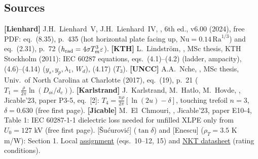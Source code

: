 \subsection*{Sources}
\small \textbf{[Lienhard]} J.H.~Lienhard~V, J.H.~Lienhard~IV, , 6th ed., v6.00 (2024), free PDF: eq.~(8.35), p.~435 (hot horizontal plate facing up, \(\mathrm{Nu}=0.14\,\mathrm{Ra}^{1/3}\)) and eq.~(2.31), p.~72 (\(h_{\rm rad}=4\sigma T_m^3\varepsilon\)).
\textbf{[KTH]} L.~Lindstr\"om, , MSc thesis, KTH Stockholm (2011): IEC 60287 equations, eqs.~(4.1)--(4.2) (ladder, ampacity), (4.6)--(4.14) (\(y_s,y_p,\lambda_1\), \(W_d\)), (4.17) (\(T_3\)).
\textbf{[UNCC]} A.A.~Nche, , MSc thesis, Univ.\ of North Carolina at Charlotte (2017), eq.~(19), p.~21 (\(T_1=\frac{\rho}{2\pi}\ln(D_{oi}/d_c)\)).
\textbf{[Karlstrand]} J.~Karlstrand, M.~Hatlo, M.~Hovde, , Jicable'23, paper P3-5, eq.~[2]: \(T_4=\frac{n\rho}{2\pi}[\ln(2u)-\delta]\), touching trefoil \(n=3\), \(\delta=0.630\) (free first page).
\textbf{[Jicable]} M.~El~Chmouri, , Jicable'23, paper E10-4, Table 1: IEC 60287-1-1 dielectric loss needed for unfilled XLPE only from \(U_0=127\) kV (free first page).
[\v{S}u\'{c}urovi\'{c}] (\(\tan\delta\)) and [Enescu] (\(\rho_T=3.5\) K\,m/W): Section 1.
Local \href{../NMES_Assignment_2026.pdf}{assignment} (eqs.\ 10--12, 15) and
\href{../Datasheet NKT 33 kV single core cable XLPE-AL.pdf}{NKT datasheet} (rating conditions).

